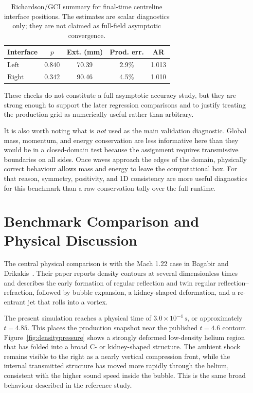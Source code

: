 \documentclass[final,3p,times,twocolumn]{elsarticle}
\begin{document}
\begin{table}[t]
\centering
\caption{Richardson/GCI summary for final-time centreline interface positions. The estimates are scalar diagnostics only; they are not claimed as full-field asymptotic convergence.}
\label{tab:interface_richardson}
\small
\setlength{\tabcolsep}{3pt}
\begin{tabular}{lcccc}
\toprule
Interface & $p$ & Ext. (mm) & Prod. err. & AR \\
\midrule
Left & 0.840 & 70.39 & 2.9\% & 1.013 \\
Right & 0.342 & 90.46 & 4.5\% & 1.010 \\
\bottomrule
\end{tabular}
\normalsize
\end{table}

These checks do not constitute a full asymptotic accuracy study, but they are strong enough to support the later regression comparisons and to justify treating the production grid as numerically useful rather than arbitrary.

It is also worth noting what is \emph{not} used as the main validation diagnostic. Global mass, momentum, and energy conservation are less informative here than they would be in a closed-domain test because the assignment requires transmissive boundaries on all sides. Once waves approach the edges of the domain, physically correct behaviour allows mass and energy to leave the computational box. For that reason, symmetry, positivity, and 1D consistency are more useful diagnostics for this benchmark than a raw conservation tally over the full runtime.

\section{Benchmark Comparison and Physical Discussion}

The central physical comparison is with the Mach 1.22 case in Bagabir and Drikakis~\cite{bagabir2001}. Their paper reports density contours at several dimensionless times and describes the early formation of regular reflection and twin regular reflection--refraction, followed by bubble expansion, a kidney-shaped deformation, and a re-entrant jet that rolls into a vortex.

The present simulation reaches a physical time of $3.0 \times 10^{-4}~\mathrm{s}$, or approximately $t = 4.85$. This places the production snapshot near the published $t = 4.6$ contour. Figure~\ref{fig:densitypressure} shows a strongly deformed low-density helium region that has folded into a broad C- or kidney-shaped structure. The ambient shock remains visible to the right as a nearly vertical compression front, while the internal transmitted structure has moved more rapidly through the helium, consistent with the higher sound speed inside the bubble. This is the same broad behaviour described in the reference study.
\end{document}

